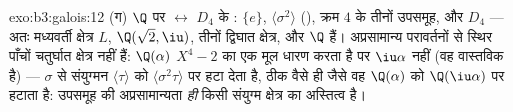 \begin{solution}{exo:b3:galois:12}
(ग) $\Q$ पर  $\leftrightarrow$ $D_4$ के : $\{e\}$, $\langle\sigma^2\rangle$
(), क्रम $4$ के तीनों उपसमूह, और $D_4$ --- अतः 
मध्यवर्ती क्षेत्र $L$, $\Q(\sqrt2, \iu)$, तीनों द्विघात क्षेत्र, और $\Q$
हैं। अप्रसामान्य परावर्तनों से स्थिर पाँचों चतुर्घात क्षेत्र 
नहीं हैं: $\Q(\alpha)$ $X^4 - 2$ का एक मूल धारण करता है पर $\iu\alpha$ नहीं (वह
वास्तविक है) --- $\sigma$ से संयुग्मन $\langle\tau\rangle$ को $\langle\sigma^2\tau\rangle$ पर हटा देता है,
ठीक वैसे ही जैसे वह $\Q(\alpha)$ को $\Q(\iu\alpha)$ पर हटाता है: उपसमूह की अप्रसामान्यता
\emph{ही} किसी संयुग्म क्षेत्र का अस्तित्व है।
\end{solution}

